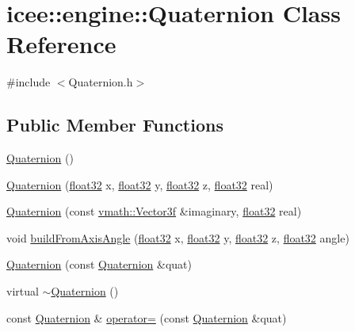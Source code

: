 \hypertarget{classicee_1_1engine_1_1Quaternion}{
\section{icee::engine::Quaternion Class Reference}
\label{classicee_1_1engine_1_1Quaternion}
}


{\ttfamily \#include $<$Quaternion.h$>$}

\subsection*{Public Member Functions}
\begin{DoxyCompactItemize}
\item 
\hyperlink{classicee_1_1engine_1_1Quaternion_af05d03b4ca06b0a4e321915ea1bc415f}{Quaternion} ()
\item 
\hyperlink{classicee_1_1engine_1_1Quaternion_a0efc38d80f6bca5de0b06dcc5aaa768d}{Quaternion} (\hyperlink{namespacecompatibility_a32a2d006ac2172c0f859370287f0104c}{float32} x, \hyperlink{namespacecompatibility_a32a2d006ac2172c0f859370287f0104c}{float32} y, \hyperlink{namespacecompatibility_a32a2d006ac2172c0f859370287f0104c}{float32} z, \hyperlink{namespacecompatibility_a32a2d006ac2172c0f859370287f0104c}{float32} real)
\item 
\hyperlink{classicee_1_1engine_1_1Quaternion_a6ab9de3854b0e2a1372313862aa7c867}{Quaternion} (const \hyperlink{classvmath_1_1Vector3f}{vmath::Vector3f} \&imaginary, \hyperlink{namespacecompatibility_a32a2d006ac2172c0f859370287f0104c}{float32} real)
\item 
void \hyperlink{classicee_1_1engine_1_1Quaternion_a76cddfcf2c2c2dcd55ff338f203d63a8}{buildFromAxisAngle} (\hyperlink{namespacecompatibility_a32a2d006ac2172c0f859370287f0104c}{float32} x, \hyperlink{namespacecompatibility_a32a2d006ac2172c0f859370287f0104c}{float32} y, \hyperlink{namespacecompatibility_a32a2d006ac2172c0f859370287f0104c}{float32} z, \hyperlink{namespacecompatibility_a32a2d006ac2172c0f859370287f0104c}{float32} angle)
\item 
\hyperlink{classicee_1_1engine_1_1Quaternion_addfb7d2ddf26bb468139758dbacfdb09}{Quaternion} (const \hyperlink{classicee_1_1engine_1_1Quaternion}{Quaternion} \&quat)
\item 
virtual \hyperlink{classicee_1_1engine_1_1Quaternion_af868c4f5ef7144e5c5b59895685034f3}{$\sim$Quaternion} ()
\item 
const \hyperlink{classicee_1_1engine_1_1Quaternion}{Quaternion} \& \hyperlink{classicee_1_1engine_1_1Quaternion_a68faa999336ddb833f942046973ead53}{operator=} (const \hyperlink{classicee_1_1engine_1_1Quaternion}{Quaternion} \&quat)

\end{DoxyCompactItemize}
